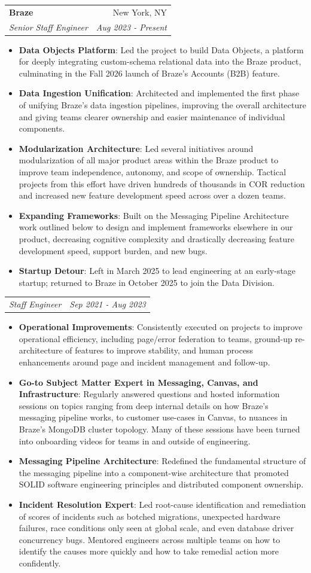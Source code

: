 \documentclass[letterpaper,10pt]{article}
\makeatletter
\newcommand{\resumeItem}[2]{
  \item\small{
    \textbf{#1}{: #2 \vspace{-2pt}}
  }
}
\newcommand{\resumeSubheading}[4]{
  \vspace{-1pt}\item
    \begin{tabular*}{0.97\textwidth}[t]{l@{\extracolsep{\fill}}r}
      \textbf{#1} & #2 \\
      \textit{\small#3} & \textit{\small #4} \\
    \end{tabular*}\vspace{-5pt}
}
\newcommand{\resumeSubSubheading}[2]{
    \begin{tabular*}{0.97\textwidth}{l@{\extracolsep{\fill}}r}
      \textit{\small#1} & \textit{\small #2} \\
    \end{tabular*}\vspace{-5pt}
}
\newcommand{\resumeItemListStart}{\begin{itemize}}
\newcommand{\resumeItemListEnd}{\end{itemize}\vspace{-5pt}}
\makeatother
\begin{document}
    \resumeSubheading
      {Braze}{New York, NY}
      {Senior Staff Engineer}{Aug 2023 - Present}
       \resumeItemListStart
        \resumeItem{Data Objects Platform}
          {Led the project to build Data Objects, a platform for deeply integrating custom-schema relational data into the Braze product, culminating in the Fall 2026 launch of Braze's Accounts (B2B) feature.}
        \resumeItem{Data Ingestion Unification}
          {Architected and implemented the first phase of unifying Braze's data ingestion pipelines, improving the overall architecture and giving teams clearer ownership and easier maintenance of individual components.}
        \resumeItem{Modularization Architecture}
          {Led several initiatives around modularization of all major product areas within the Braze product to improve team independence, autonomy, and scope of ownership. Tactical projects from this effort have driven hundreds of thousands in COR reduction and increased new feature development speed across over a dozen teams.}
        \resumeItem{Expanding Frameworks}
          {Built on the Messaging Pipeline Architecture work outlined below to design and implement frameworks elsewhere in our product, decreasing cognitive complexity and drastically decreasing feature development speed, support burden, and new bugs.}
        \resumeItem{Startup Detour}
          {Left in March 2025 to lead engineering at an early-stage startup; returned to Braze in October 2025 to join the Data Division.}
       \resumeItemListEnd
    \resumeSubSubheading
      {Staff Engineer}{Sep 2021 - Aug 2023}
       \resumeItemListStart
        \resumeItem{Operational Improvements}
          {Consistently executed on projects to improve operational efficiency, including page/error federation to teams, ground-up re-architecture of features to improve stability, and human process enhancements around page and incident management and follow-up.}
        \resumeItem{Go-to Subject Matter Expert in Messaging, Canvas, and Infrastructure}
          {Regularly answered questions and hosted information sessions on topics ranging from deep internal details on how Braze's messaging pipeline works, to customer use-cases in Canvas, to nuances in Braze's MongoDB cluster topology. Many of these sessions have been turned into onboarding videos for teams in and outside of engineering.}
        \resumeItem{Messaging Pipeline Architecture}
          {Redefined the fundamental structure of the messaging pipeline into a component-wise architecture that promoted SOLID software engineering principles and distributed component ownership.}
        \resumeItem{Incident Resolution Expert}
          {Led root-cause identification and remediation of scores of incidents such as botched migrations, unexpected hardware failures, race conditions only seen at global scale, and even database driver concurrency bugs. Mentored engineers across multiple teams on how to identify the causes more quickly and how to take remedial action more confidently.}
      \resumeItemListEnd
\end{document}

